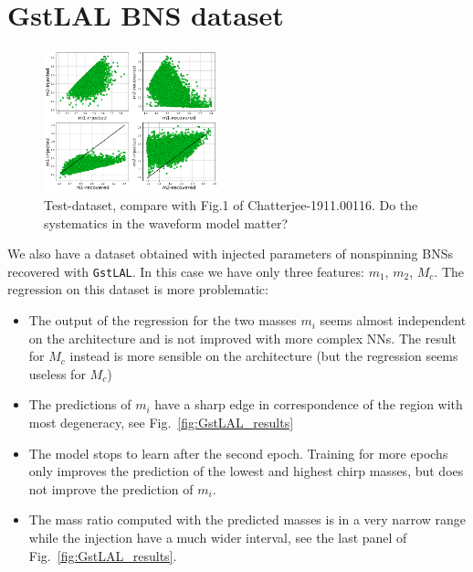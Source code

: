 \documentclass[prd,aps,twocolumn,a4paper,showkeys,nofootinbib]{article}
\begin{document}
\section{GstLAL BNS dataset}
\label{sec:GstLAL}
\begin{figure}[]
  \center
  \includegraphics[width=0.45\textwidth]{./Figs/GstLAL_paperlike_m1m2.png}
  \caption{\label{fig:GstLAL_paperlike} Test-dataset, compare with Fig.1 of Chatterjee-1911.00116.
  Do the systematics in the waveform model matter?}
\end{figure}

We also have a dataset obtained with injected parameters of nonspinning 
BNSs recovered with \texttt{GstLAL}.
In this case we have only three features: $m_1$, $m_2$, $M_c$.
The regression on this dataset is more problematic:
\begin{itemize}
\item The output of the regression for the two masses $m_i$ seems almost independent on the 
architecture and is not improved with more complex NNs. The result for $M_c$ instead is 
more sensible on the architecture (but the regression seems useless for $M_c$)

\item The predictions of $m_i$ have a sharp edge in correspondence of the region with 
most degeneracy, see Fig.~\ref{fig:GstLAL_results}

\item The model stops to learn after the second epoch. Training for more epochs only improves
the prediction of the lowest and highest chirp masses, but does not improve the prediction
of $m_i$. 

\item The mass ratio computed with the predicted masses is in a very narrow range while
the injection have a much wider interval, see the last panel of Fig.~\ref{fig:GstLAL_results}.

\end{itemize} 
\end{document}

